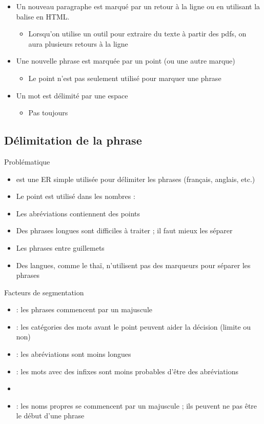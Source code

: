 \documentclass{KodeBook}
\begin{document}
\begin{itemize}
	\item Un nouveau paragraphe est marqué par un retour à la ligne ou en utilisant la balise  en HTML.
	\begin{itemize}
		\item Lorsqu'on utilise un outil pour extraire du texte à partir des pdfs, on aura plusieurs retours à la ligne 
	\end{itemize}
	\item Une nouvelle phrase est marquée par un point (ou une autre marque)
	\begin{itemize}
		\item Le point n'est pas seulement utilisé pour marquer une phrase
	\end{itemize}
	\item Un mot est délimité par une espace 
	\begin{itemize}
		\item Pas toujours 
	\end{itemize}
\end{itemize}

\subsection{Délimitation de la phrase}

Problématique
\begin{itemize}
	\item \expword{/[.?!]/} est une ER simple utilisée pour délimiter les phrases (français, anglais, etc.)
	\item Le point est utilisé dans les nombres : 
	\item Les abréviations contiennent des points
	\item Des phrases longues sont difficiles à traiter ; il faut mieux les séparer 
	\item Les phrases entre guillemets
	\item Des langues, comme le thaï, n'utilisent pas des marqueurs pour séparer les phrases  
\end{itemize}

Facteurs de segmentation
\begin{itemize}
	\item {} : les phrases commencent par un majuscule
	\item {} : les catégories des mots avant le point peuvent aider la décision (limite ou non)
	\item {} : les abréviations sont moins longues 
	\item {} : les mots avec des infixes sont moins probables d'être des abréviations
	\item {} 
	\item {} : les noms propres se commencent par un majuscule ; ils peuvent ne pas être le début d'une phrase
\end{itemize}
\end{document}
